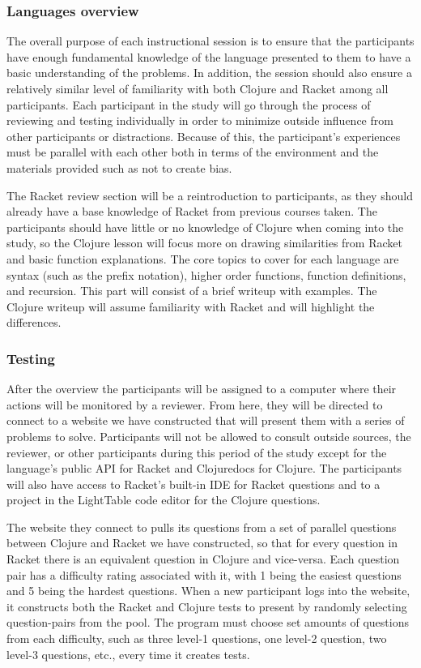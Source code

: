 \documentclass[12pt]{article}
\begin{document}
\subsubsection{Languages overview}\label{subsec:overview}

The overall purpose of each instructional session is to ensure that the participants have enough fundamental knowledge of the language presented to them to have a basic understanding of the problems. 
In addition, the session should also ensure a relatively similar level of familiarity with both Clojure and Racket among all participants. 
Each participant in the study will go through the process of reviewing and testing individually in order to minimize outside influence from other participants or distractions. 
Because of this, the participant's experiences must be parallel with each other both in terms of the environment and the materials provided such as not to create bias.

The Racket review section will be a reintroduction to participants, as they should already have a base knowledge of Racket from previous courses taken.
The participants should have little or no knowledge of Clojure when coming into the study, so the Clojure lesson will focus more on drawing similarities from Racket and basic function explanations.
The core topics to cover for each language are syntax (such as the prefix notation), higher order functions, function definitions, and recursion.
This part will consist of a brief writeup with examples. The Clojure writeup will assume familiarity with Racket and will highlight the differences. 

\subsubsection{Testing}\label{subsec:testing}

After the overview the participants will be assigned to a computer where their actions will be monitored by a reviewer. 
From here, they will be directed to connect to a website we have constructed that will present them with a series of problems to solve. 
Participants will not be allowed to consult outside sources, the reviewer, or other participants during this period of the study except for the language's public API for Racket and Clojuredocs for Clojure.
The participants will also have access to Racket's built-in IDE for Racket questions and to a project in the LightTable code editor for the Clojure questions. 

The website they connect to pulls its questions from a set of parallel questions between Clojure and Racket we have constructed, so that for every question in Racket there is an equivalent question in Clojure and vice-versa.
Each question pair has a difficulty rating associated with it, with 1 being the easiest questions and 5 being the hardest questions.
When a new participant logs into the website, it constructs both the Racket and Clojure tests to present by randomly selecting question-pairs from the pool. 
The program must choose set amounts of questions from each difficulty, such as three level-1 questions, one level-2 question, two level-3 questions, etc., every time it creates tests. 
\end{document}
